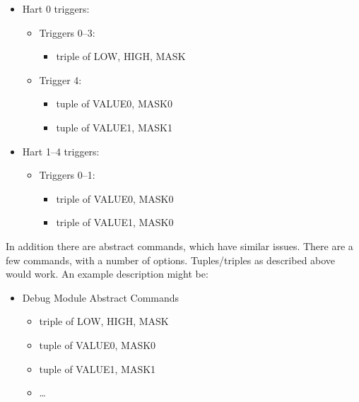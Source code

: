 \begin{itemize}
    \item Hart 0 triggers:
          \begin{itemize}
              \item Triggers 0--3:
                    \begin{itemize}
                        \item triple of LOW, HIGH, MASK
                    \end{itemize}
              \item Trigger 4:
                    \begin{itemize}
                        \item tuple of VALUE0, MASK0
                        \item tuple of VALUE1, MASK1
                    \end{itemize}
          \end{itemize}
    \item Hart 1--4 triggers:
          \begin{itemize}
              \item Triggers 0--1:
                    \begin{itemize}
                        \item triple of VALUE0, MASK0
                        \item triple of VALUE1, MASK0
                    \end{itemize}
          \end{itemize}
\end{itemize}

In addition there are abstract commands, which have similar issues. There are
a few commands, with a number of options. Tuples/triples as described above
would work. An example description might be:

\begin{itemize}
    \item Debug Module Abstract Commands
          \begin{itemize}
              \item triple of LOW, HIGH, MASK
              \item tuple of VALUE0, MASK0
              \item tuple of VALUE1, MASK1
              \item \dots
          \end{itemize}
\end{itemize}

